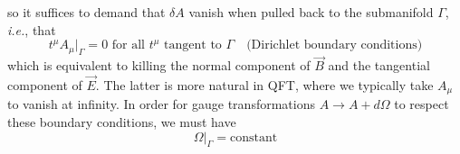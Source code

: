 \documentclass[11pt,letterpaper]{article}
\begin{document}
so it suffices to demand that $\delta A$ vanish when pulled back to the submanifold $\Gamma$, \textit{i.e.}, that \begin{equation}
t^\mu A_\mu |_\Gamma = 0 \mbox{ for all } t^\mu \mbox{ tangent to } \Gamma \quad \mbox{(Dirichlet boundary conditions)}
\end{equation}
which is equivalent to killing the normal component of $\vec{B}$ and the tangential component of $\vec{E}$. The latter is more natural in QFT, where we typically take $A_\mu$ to vanish at infinity. In order for gauge transformations $A \to A + d \Omega$ to respect these boundary conditions, we must have \begin{equation}
\Omega|_\Gamma = \mbox{constant}
\end{equation}




\end{document}
